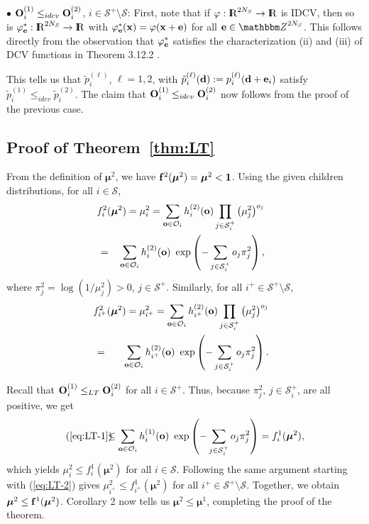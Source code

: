 \documentclass[10pt, journal, compsoc]{IEEEtran}
\newcommand {\cO}{{\mathcal{O}}}
\newcommand {\cS}{{\mathcal{S}}}
\newcommand {\bff} {{\bf f}}
\newcommand {\bd} {{\bf d}}
\newcommand {\be} {{\bf e}}
\newcommand {\bo} {{\bf o}}
\newcommand {\bx} {{\bf x}}
\newcommand {\bmu} {\boldsymbol{\mu}}
\newcommand {\Z} {{\mathbbm Z}}
\newcommand {\R} {{\rm I\kern-2.5pt R}}
\newcommand{\beqa}{\begin{eqnarray}}
\newcommand{\eeqa}{\end{eqnarray}}
\newcommand{\beqan}{\begin{eqnarray*}}
\newcommand{\eeqan}{\end{eqnarray*}}
\newcommand{\myb}{\hspace{-0.1in}}
\newcommand{\myeq}{& \hspace{-0.1in} = & \hspace{-0.1in}}
\newcommand{\lb}{\nonumber \\}
\newcommand{\myleq}{& \myb \leq & \myb}
\newcommand{\myhb}{\hspace{-0.3in}}
\begin{document}
$\bullet$ ${\bf O}^{(1)}_i \leq_{idcv} 
{\bf O}^{(2)}_i$, $i \in \cS^+ \setminus
\cS$: First, note that if $\varphi:\R^{2 N_S} \to \R$ is IDCV, 
then so is $\varphi^*_{\be}: \R^{2 N_S} \to \R$ 
with $\varphi^*_{\be}(\bx)
= \varphi(\bx + \be)$ for all $\be \in \Z^{2 N_S}$. This
follows directly from the observation that 
$\varphi^*_{\be}$ satisfies the characterization
(ii) and (iii) of DCV functions 
in Theorem 3.12.2 \cite[p.132]{MullerStoyan}.

This tells us that $\tilde{p}^{(\ell)}_i$, $\ell = 1, 2$, 
with $\tilde{p}^{(\ell)}_i(\bd) := 
p^{(\ell)}_i(\bd +\be_i)$ satisfy $\tilde{p}^{(1)}_i
\leq_{idcv} \tilde{p}^{(2)}_i$. The claim
that ${\bf O}^{(1)}_i \leq_{idcv} {\bf O}^{(2)}_i$ 
now follows from the proof of the previous case. 



\subsection{Proof of Theorem~\ref{thm:LT}}
	\label{appen:LT}


From the definition of $\bmu^2$, we have
$\bff^2(\bmu^2) = \bmu^2 < {\bf 1}$.
Using the given children distributions, 
for all $i \in \cS$,
\beqa
&& \myhb f^2_i(\bmu^2) = \mu^2_i
= \sum_{\bo \in \cO_i} 
	h^{(2)}_i(\bo) 
	\prod_{j \in \cS^+_i} \left( 
		\mu^2_{j} \right)^{o_j} \lb 
\myeq \sum_{\bo \in \cO_i} 
	h^{(2)}_i(\bo) \ \exp\left( -
		\sum_{j \in \cS^+_i} o_j
		\pi^2_j \right),
	\label{eq:LT-1}
\eeqa
where $\pi^2_j = \log(1 / \mu^2_j) > 0$, 
$j \in \cS^+$. 
Similarly, for all $i^+ \in \cS^+ \setminus
\cS$, 
\beqa
&& \myhb f^2_{i^+}(\bmu^2) = \mu^2_{i^+}
= \sum_{\bo \in \cO_i} 
	h^{(2)}_{i^+}(\bo) 
	\prod_{j \in \cS^+_i} \left( 
		\mu^2_{j} \right)^{o_j} \lb 
\myeq \sum_{\bo \in \cO_i} 
	h^{(2)}_{i^+}(\bo) \ \exp\left( - 
	\sum_{j \in \cS^+_i} o_j
		\pi^2_j \right).
	\label{eq:LT-2}
\eeqa

Recall that ${\bf O}^{(1)}_i \leq_{LT} {\bf O}^{(2)}_i$ 
for all $i \in \cS^+$. Thus, because $\pi^2_j$, 
$j \in \cS^+_i$, 
are all positive, we get
\beqan
(\ref{eq:LT-1})
\myleq \sum_{\bo \in \cO_i} 
	h^{(1)}_i(\bo) \ \exp\left( - 
	\sum_{j \in \cS^+_i} o_j
		\pi^2_j \right) 
= f^1_i(\bmu^2),  
\eeqan
which yields $\mu^2_i \leq f^1_i(\bmu^2)$ for all 
$i \in \cS$. Following the same argument 
starting with (\ref{eq:LT-2}) gives
$\mu^2_{i^+} \leq f^1_{i^+}(\bmu^2)$ for all 
$i^+ \in \cS^+ \setminus \cS$. Together, we obtain
$\bmu^2 \leq \bff^1(\bmu^2)$. Corollary
2 \cite[p. 42]{Harris} now tells us $\bmu^2 
\leq \bmu^1$, completing the proof of the 
theorem. 
\end{document}
